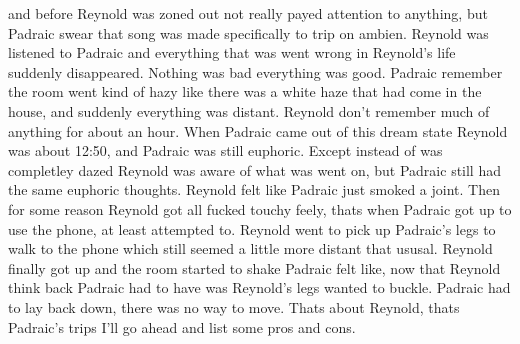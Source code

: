 \documentclass[12pt]{book}
\begin{document}
and before Reynold was zoned out not really payed attention to anything, but Padraic swear that song was made specifically to trip on ambien. Reynold was listened to Padraic and everything that was went wrong in Reynold's life suddenly disappeared. Nothing was bad everything was good. Padraic remember the room went kind of hazy like there was a white haze that had come in the house, and suddenly everything was distant. Reynold don't remember much of anything for about an hour. When Padraic came out of this dream state Reynold was about 12:50, and Padraic was still euphoric. Except instead of was completley dazed Reynold was aware of what was went on, but Padraic still had the same euphoric thoughts. Reynold felt like Padraic just smoked a joint. Then for some reason Reynold got all fucked touchy feely, thats when Padraic got up to use the phone, at least attempted to. Reynold went to pick up Padraic's legs to walk to the phone which still seemed a little more distant that ususal. Reynold finally got up and the room started to shake Padraic felt like, now that Reynold think back Padraic had to have was Reynold's legs wanted to buckle. Padraic had to lay back down, there was no way to move. Thats about Reynold, thats Padraic's trips I'll go ahead and list some pros and cons.
\end{document}
